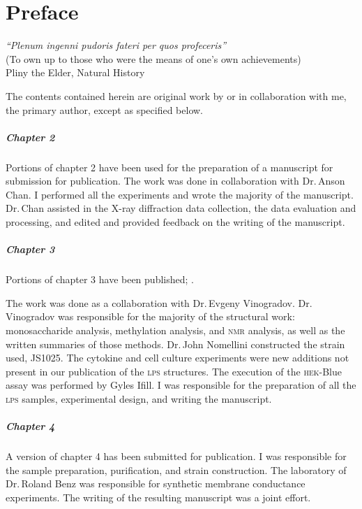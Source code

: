 
\chapter{Preface}
\begin{epigraph} 
\textit{``Plenum ingenni pudoris fateri per quos profeceris''}\\
(To own up to those who were the means of one's own achievements)\\
Pliny the Elder, Natural History
\end{epigraph} 

The contents contained herein are original work by or in collaboration with me,
the primary author, except as specified below.

\paragraph{Chapter 2} 
Portions of chapter 2 have been used for the preparation of a manuscript for
submission for publication. The work was done in collaboration with Dr.\,Anson
Chan. I performed all the experiments and wrote the majority of the
manuscript. Dr.\,Chan assisted in the X-ray diffraction data collection, the
data evaluation and processing, and edited and provided feedback on the writing
of the manuscript. 

\paragraph{Chapter 3}
Portions of chapter 3 have been published;
\makeatletter%
%
\bgroup%
  \def\blx@maxcitenames{99}%
  \makeatother%
  .
\egroup%

\makeatletter
{}
\makeatother
 The work was
done as a collaboration with Dr.\,Evgeny Vinogradov. Dr.\,Vinogradov was
responsible for the majority of the structural work: monosaccharide analysis,
methylation analysis, and \textsc{nmr} analysis, as well as the written
summaries of those methods. Dr.\,John Nomellini constructed the strain used,
JS1025. The cytokine and cell culture experiments were new additions not present
in our publication of the \textsc{lps} structures. The execution of the \textsc{hek}-Blue assay was performed by Gyles Ifill. I was
responsible for the preparation of all the \textsc{lps} samples, experimental design, and
writing the manuscript. 

\paragraph{Chapter 4}
A version of chapter 4 has been submitted for publication. I was responsible for
the sample preparation, purification, and strain construction. The laboratory of
Dr.\,Roland Benz was responsible for synthetic membrane conductance experiments.
The writing of the resulting manuscript was a joint effort.
